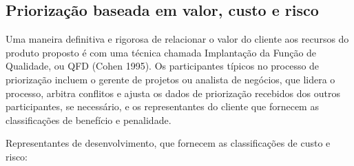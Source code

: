 \documentclass[runningheads]{llncs}
\begin{document}
\subsection{Priorização baseada em valor, custo e risco}

Uma maneira definitiva e rigorosa de relacionar o valor do cliente aos recursos do produto proposto é com uma técnica chamada Implantação da Função de Qualidade, ou QFD (Cohen 1995). 
Os participantes típicos no processo de priorização incluem o gerente de projetos ou analista de negócios, que lidera o processo, arbitra conflitos e ajusta os dados de priorização recebidos dos outros participantes, se necessário, e os representantes do cliente que fornecem as classificações de benefício e penalidade.

Representantes de desenvolvimento, que fornecem as classificações de custo e risco:
\end{document}
